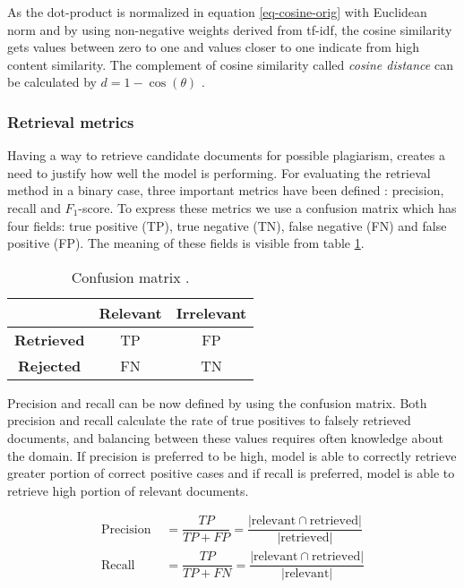 \noindent
As the dot-product is normalized in equation \ref{eq-cosine-orig} with Euclidean norm and by using non-negative weights derived from tf-idf, the cosine similarity gets values between zero to one and values closer to one indicate from high content similarity. The complement of cosine similarity called \emph{cosine distance} can be calculated by $d = 1 - \cos(\theta)$ \cite{}.

\subsubsection{Retrieval metrics}

Having a way to retrieve candidate documents for possible plagiarism, creates a need to justify how well the model is performing. For evaluating the retrieval method in a binary case, three important metrics have been defined \cite{Manning:2008:IIR:1394399}: precision, recall and $F_1$-score. To express these metrics we use a confusion matrix which has four fields: true positive (TP), true negative (TN), false negative (FN) and false positive (FP). The meaning of these fields is visible from table \ref{tbl-confmatr-orig}.


\begin{table}[ht]
\centering
\caption{Confusion matrix \cite{Manning:2008:IIR:1394399}.}
\label{tbl-confmatr-orig}
\begin{tabular}{c|c|c}
          & \bf Relevant & \bf Irrelevant \\ \hline
\bf Retrieved & TP      & FP        \\
\bf Rejected  & FN      & TN       
\end{tabular}
\end{table}

Precision and recall can be now defined by using the confusion matrix. Both precision and recall calculate the rate of true positives to falsely retrieved documents, and balancing between these values requires often knowledge about the domain. If precision is preferred to be high, model is able to correctly retrieve greater portion of correct positive cases and if recall is preferred, model is able to retrieve high portion of relevant documents. 

\begin{align}
    \text{Precision } &= \dfrac{TP}{TP + FP} = \dfrac{|\text{relevant} \cap \text{retrieved}|}{|\text{retrieved}|}\\
    \text{Recall } &= \dfrac{TP}{TP + FN} = \dfrac{|\text{relevant} \cap \text{retrieved}|}{|\text{relevant}|}
\end{align}

